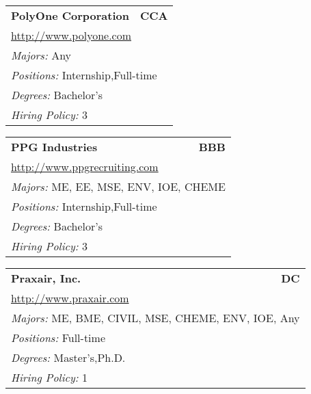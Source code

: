 \documentclass[twoside]{article}
\begin{document}
\begin{center}
\begin{multicols}{3}
\begin{FlushLeft}
\begin{minipage}{.9\columnwidth}
\end{minipage}
 
\begin{minipage}{.9\columnwidth}\begin{tabularx}{.95\columnwidth}{Xr}
                 {\Large\bf PolyOne Corporation} & {\Large\bf CCA}\\
    \multicolumn{2}{p{.95\columnwidth}}{\url{http://www.polyone.com}}\\
    \multicolumn{2}{p{.95\columnwidth}}{\emph{Majors:} Any}\\
    \multicolumn{2}{p{.95\columnwidth}}{\emph{Positions:} Internship,Full-time}\\
    \multicolumn{2}{p{.95\columnwidth}}{\emph{Degrees:} Bachelor's}\\
    \multicolumn{2}{p{.95\columnwidth}}{\emph{Hiring Policy:} 3}\\
    \end{tabularx}
    
\end{minipage}
 
\begin{minipage}{.9\columnwidth}\begin{tabularx}{.95\columnwidth}{Xr}
                 {\Large\bf PPG Industries} & {\Large\bf BBB}\\
    \multicolumn{2}{p{.95\columnwidth}}{\url{http://www.ppgrecruiting.com}}\\
    \multicolumn{2}{p{.95\columnwidth}}{\emph{Majors:} ME, EE, MSE, ENV, IOE, CHEME}\\
    \multicolumn{2}{p{.95\columnwidth}}{\emph{Positions:} Internship,Full-time}\\
    \multicolumn{2}{p{.95\columnwidth}}{\emph{Degrees:} Bachelor's}\\
    \multicolumn{2}{p{.95\columnwidth}}{\emph{Hiring Policy:} 3}\\
    \end{tabularx}
    
\end{minipage}
 
\begin{minipage}{.9\columnwidth}\begin{tabularx}{.95\columnwidth}{Xr}
                 {\Large\bf Praxair, Inc.} & {\Large\bf DC}\\
    \multicolumn{2}{p{.95\columnwidth}}{\url{http://www.praxair.com}}\\
    \multicolumn{2}{p{.95\columnwidth}}{\emph{Majors:} ME, BME, CIVIL, MSE, CHEME, ENV, IOE, Any}\\
    \multicolumn{2}{p{.95\columnwidth}}{\emph{Positions:} Full-time}\\
    \multicolumn{2}{p{.95\columnwidth}}{\emph{Degrees:} Master's,Ph.D.}\\
    \multicolumn{2}{p{.95\columnwidth}}{\emph{Hiring Policy:} 1}\\
    \end{tabularx}
    

\end{minipage}
\end{FlushLeft}
\end{multicols}
\end{center}
\end{document}
